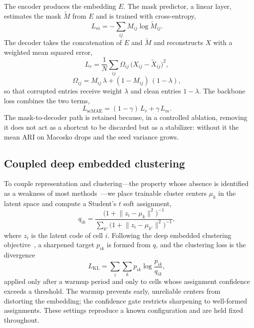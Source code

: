 The encoder produces the embedding $E$. The mask predictor, a linear layer, estimates the
mask $\widetilde{M}$ from $E$ and is trained with cross-entropy,
\begin{equation}
L_m = -\sum_{ij} M_{ij}\log \widetilde{M}_{ij}.
\end{equation}
The decoder takes the concatenation of $E$ and $\widetilde{M}$ and reconstructs $X$ with a
weighted mean squared error,
\begin{equation}
L_r = \frac{1}{N}\sum_{ij}\Omega_{ij}\,\bigl(X_{ij}-\widetilde{X}_{ij}\bigr)^2,
\end{equation}
\begin{equation}
\Omega_{ij} = M_{ij}\,\lambda + (1-M_{ij})\,(1-\lambda),
\end{equation}
so that corrupted entries receive weight $\lambda$ and clean entries $1-\lambda$. The
backbone loss combines the two terms,
\begin{equation}
L_{\mathrm{scMAE}} = (1-\gamma)\,L_r + \gamma\,L_m.
\end{equation}
The mask-to-decoder path is retained because, in a controlled ablation, removing it does
not act as a shortcut to be discarded but as a stabilizer: without it the mean ARI on
Macosko drops and the seed variance grows.

\subsection{Coupled deep embedded clustering}

To couple representation and clustering---the property whose absence is identified as a
weakness of most methods~\citep{scclubench2025}---we place trainable cluster centers
$\mu_k$ in the latent space and compute a Student's $t$ soft assignment,
\begin{equation}
q_{ik} = \frac{\bigl(1+\lVert z_i-\mu_k\rVert^2\bigr)^{-1}}
{\sum_{k'}\bigl(1+\lVert z_i-\mu_{k'}\rVert^2\bigr)^{-1}},
\end{equation}
where $z_i$ is the latent code of cell $i$. Following the deep embedded clustering
objective~\citep{dec2016}, a sharpened target $p_{ik}$ is formed from $q$, and the
clustering loss is the divergence
\begin{equation}
L_{\mathrm{KL}} = \sum_{i}\sum_{k} p_{ik}\log\frac{p_{ik}}{q_{ik}},
\end{equation}
applied only after a warmup period and only to cells whose assignment confidence exceeds
a threshold. The warmup prevents early, unreliable centers from distorting the embedding;
the confidence gate restricts sharpening to well-formed assignments. These settings
reproduce a known configuration and are held fixed throughout.


